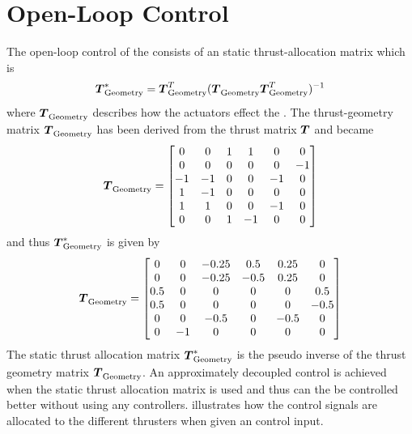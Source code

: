 \section{Open-Loop Control} \label{sec:openloop}   
The open-loop control of the \abbrROV consists of an static thrust-allocation matrix which is
\begin{equation}
    \thrusterGeometryOnes[*] = \thrusterGeometryOnes[T](\thrusterGeometryOnes \thrusterGeometryOnes[T])^{-1}
\end{equation}
where $\thrusterGeometryOnes$ describes how the actuators effect the \abbrROV \citep{thrustallocation}. The thrust-geometry matrix $\thrusterGeometryOnes$ has been derived from the thrust matrix $\thrusterGeometry$ and became 
\begin{equation*}
    \thrusterGeometryOnes = 
    \begin{bmatrix}
    0  & 0  & 1 & 1  &  0 &  0 \\
    0  & 0  & 0 & 0  &  0 & -1 \\
    -1 & -1 & 0 & 0  & -1 &  0 \\
    1  & -1 & 0 & 0  &  0 &  0 \\
    1  & 1  & 0 & 0  & -1 &  0 \\
    0  & 0  & 1 & -1 &  0 &  0 \\
    \end{bmatrix}
\end{equation*}
and thus $\thrusterGeometryOnes[*]$ is given by
\begin{equation}
\thrusterGeometryOnes= \begin{bmatrix}
0 & 0 & -0.25 & 0.5 & 0.25 & 0 \\
0 & 0 & -0.25 & -0.5 & 0.25 & 0 \\
0.5 & 0 & 0 & 0 & 0 & 0.5 \\
0.5 & 0 & 0 & 0 & 0 & -0.5 \\
0 & 0 & -0.5 & 0 & -0.5 & 0 \\
0 & -1 & 0 & 0 & 0 & 0 \\
\end{bmatrix}
\end{equation}
The static thrust allocation matrix $\thrusterGeometryOnes[*]$ is the pseudo inverse of the thrust geometry matrix $\thrusterGeometryOnes$. An approximately decoupled control is achieved when the static thrust allocation matrix is used and thus can the \abbrROV be controlled better without using any controllers.  illustrates how the control signals are allocated to the different thrusters when given an control input.

